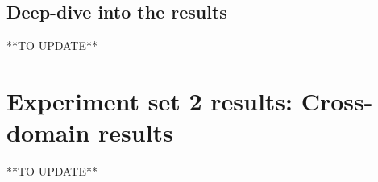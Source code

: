 \subsection{Deep-dive into the results}
**TO UPDATE**



\section{Experiment set 2 results: Cross-domain results}
**TO UPDATE**